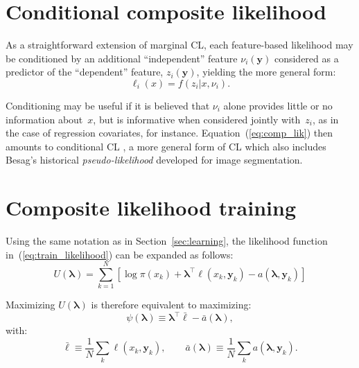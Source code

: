 \documentclass[english]{scrartcl}
\def\y{{\mathbf{y}}}
\newcommand{\blambda}{{\boldsymbol{\lambda}}}
\newcommand{\bell}{{\boldsymbol{\ell}}}
\begin{document}


\section{Conditional composite likelihood}
\label{app:conditional}

As a straightforward  extension of marginal CL, each feature-based likelihood may be conditioned by an additional ``independent'' feature $\nu_i(\y)$ considered as a predictor of the ``dependent'' feature, $z_i(\y)$, yielding the more general form:
\begin{equation}
\label{eq:cond_feat_lik}
\ell_i(x) = f(z_i|x,\nu_i).
\end{equation}

Conditioning may be useful if it is believed that $\nu_i$ alone provides little or no information about~$x$, but is informative when considered jointly with~$z_i$, as in the case of regression covariates, for instance. Equation~(\ref{eq:comp_lik}) then amounts to conditional CL \cite{Varin-11}, a more general form of CL which also includes Besag's historical {\em pseudo-likelihood} \cite{Besag-74} developed for image segmentation.


\section{Composite likelihood training}
\label{app:training}

Using the same notation as in Section~\ref{sec:learning}, the likelihood function in~(\ref{eq:train_likelihood}) can be expanded as follows:
$$
U(\blambda) 
= \sum_{k=1}^N \left[
\log \pi(x_k) + \blambda^\top \bell(x_k, \y_k) - a(\blambda,\y_k)
\right]
$$

Maximizing $U(\blambda)$ is therefore equivalent to maximizing: 
$$
\psi(\blambda) \equiv \blambda^\top \bar{\bell} - \bar{a}(\blambda), 
$$
with:
$$
\bar{\bell} \equiv \frac{1}{N} \sum_k \bell(x_k,\y_k),
\qquad
\bar{a}(\blambda) \equiv \frac{1}{N} \sum_k a(\blambda,\y_k).
$$
\end{document}
